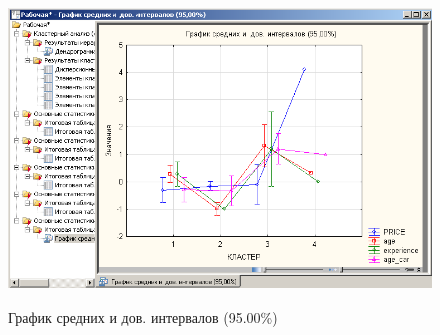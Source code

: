\begin{figure}[!h]
  \centering

  \includegraphics[height=8.2cm]
  {inc/cars_my/3.14.PNG}

  \caption{График средних и дов. интервалов (95.00\%)}
  \label{fig:3_14}
\end{figure}













